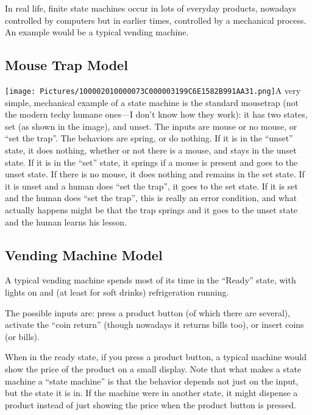 In real life, finite state machines occur in lots of everyday products,
nowadays controlled by computers but in earlier times, controlled by a
mechanical process. An example would be a typical vending machine.

\subsection[Mouse Trap
Model]{\texorpdfstring{\protect\hypertarget{anchor-1}{}{}Mouse Trap
Model}{Mouse Trap Model}}\label{mouse-trap-model}

\texttt{[image: Pictures/100002010000073C000003199C6E1582B991AA31.png]}A
very simple, mechanical example of a state machine is the standard
mousetrap (not the modern techy humane ones---I don't know how they
work): it has two states, set (as shown in the image), and unset. The
inputs are mouse or no mouse, or ``set the trap''. The behaviors are
spring, or do nothing. If it is in the ``unset'' state, it does nothing,
whether or not there is a mouse, and stays in the unset state. If it is
in the ``set'' state, it springs if a mouse is present and goes to the
unset state. If there is no mouse, it does nothing and remains in the
set state. If it is unset and a human does ``set the trap'', it goes to
the set state. If it is set and the human does ``set the trap'', this is
really an error condition, and what actually happens might be that the
trap springs and it goes to the unset state and the human learns his
lesson.

\subsection[Vending Machine
Model]{\texorpdfstring{\protect\hypertarget{anchor-2}{}{}Vending Machine
Model}{Vending Machine Model}}\label{vending-machine-model}

A typical vending machine spends most of its time in the ``Ready''
state, with lights on and (at least for soft drinks) refrigeration
running.

The possible inputs are: press a product button (of which there are
several), activate the ``coin return'' (though nowadays it returns bills
too), or insert coins (or bills).

When in the ready state, if you press a product button, a typical
machine would show the price of the product on a small display. Note
that what makes a state machine a ``state machine'' is that the behavior
depends not just on the input, but the state it is in. If the machine
were in another state, it might dispense a product instead of just
showing the price when the product button is pressed.

